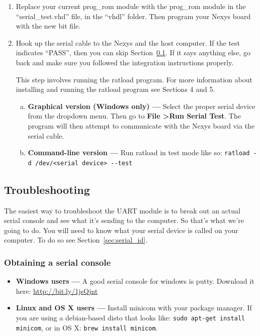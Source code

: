 \documentclass[notitlepage]{article}
\newcommand{\infosign}{\fontencoding{U}\fontfamily{futs}\huge\selectfont\char 116\relax}
\begin{document}
\begin{enumerate}
\item Replace your current prog\_rom module with the prog\_rom module in the ``serial\_test.vhd'' file, in the ``vhdl'' folder. Then program your Nexys board with the new bit file.
\item Hook up the serial cable to the Nexys and the host computer. If the test indicates ``PASS'', then you can skip Section~\ref{sec:troubleshooting}. If it says anything else, go back and make sure you followed the integration instructions properly.

\begin{infobox}
  {\infosign} This step involves running the ratload program. For more information about installing and running the ratload program see Sections 4 and 5. %
\end{infobox}

  \begin{enumerate}[a.]
  \item \textbf{Graphical version (Windows only) ---} Select the proper serial device from the dropdown menu. Then go to \textbf{File \textgreater Run Serial Test}. The program will then attempt to communicate with the Nexys board via the serial cable.

  \item \textbf{Command-line version ---} Run ratload in test mode like so: \texttt{ratload -d /dev/<serial device> -{}-test}
  \end{enumerate}
\end{enumerate}

\subsection{Troubleshooting}
\label{sec:troubleshooting}
The easiest way to troubleshoot the UART module is to break out an actual serial console and see what it's sending to the computer. So that's what we're going to do. You will need to know what your serial device is called on your computer. To do so see Section~\ref{sec:serial_id}.
\subsubsection{Obtaining a serial console}
\begin{itemize}
\item \textbf{Windows users --- } A good serial console for windows is putty. Download it here: \url{http://bit.ly/1jsQjnt}
\item \textbf{Linux and OS X users --- } Install minicom with your package manager. If you are using a debian-based disto that looks like: \texttt{sudo apt-get install minicom}, or in OS X: \texttt{brew install minicom}.
\end{itemize}
\end{document}
